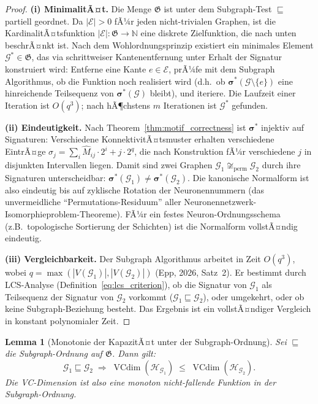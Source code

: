 ﻿\documentclass[12pt, a4paper, openany]{report}
\newtheorem{lemma}[theorem]{Lemma}
\newcommand{\N}{\mathbb{N}}
\newcommand{\calG}{\mathcal{G}}
\newcommand{\calH}{\mathcal{H}}
\newcommand{\calE}{\mathcal{E}}
\DeclareMathOperator{\VC}{VCdim}
\begin{document}
\begin{proof}
\textbf{(i) MinimalitÃ¤t.}
Die Menge $\mathfrak{G}$ ist unter dem Subgraph-Test $\sqsubseteq$ partiell
geordnet.  Da $|\calE| > 0$ fÃ¼r jeden nicht-trivialen Graphen, ist die
KardinalitÃ¤tsfunktion $|\calE| : \mathfrak{G} \to \N$ eine diskrete
Zielfunktion, die nach unten beschrÃ¤nkt ist.  Nach dem
Wohlordnungsprinzip existiert ein minimales Element $\calG^* \in \mathfrak{G}$,
das via schrittweiser Kantenentfernung unter Erhalt der Signatur konstruiert
wird: Entferne eine Kante $e \in \calE$, prÃ¼fe mit dem Subgraph Algorithmus,
ob die Funktion noch realisiert wird (d.h.\ ob $\bm{\sigma}^*(\calG \setminus \{e\})$
eine hinreichende Teilsequenz von $\bm{\sigma}^*(\calG)$ bleibt), und iteriere.
Die Laufzeit einer Iteration ist $O(q^3)$; nach hÃ¶chstens $m$ Iterationen
ist $\calG^*$ gefunden.

\textbf{(ii) Eindeutigkeit.}
Nach Theorem~\ref{thm:motif_correctness} ist $\bm{\sigma}^*$ injektiv auf
Signaturen: Verschiedene KonnektivitÃ¤tsmuster erhalten verschiedene EintrÃ¤ge
$\sigma_j = \sum_i \hat{M}_{ij} \cdot 2^i + j \cdot 2^q$, die nach
Konstruktion fÃ¼r verschiedene $j$ in disjunkten Intervallen liegen.  Damit
sind zwei Graphen $\calG_1 \not\cong_{\mathrm{perm}} \calG_2$ durch ihre
Signaturen unterscheidbar: $\bm{\sigma}^*(\calG_1) \neq \bm{\sigma}^*(\calG_2)$.
Die kanonische Normalform ist also eindeutig bis auf zyklische Rotation
der Neuronennummern (das unvermeidliche ``Permutations-Residuum'' aller
Neuronennetzwerk-Isomorphieproblem-Theoreme).  FÃ¼r ein festes Neuron-Ordnungsschema
(z.B.\ topologische Sortierung der Schichten) ist die Normalform vollstÃ¤ndig
eindeutig.

\textbf{(iii) Vergleichbarkeit.}
Der Subgraph Algorithmus arbeitet in Zeit $O(q^3)$, wobei $q = \max(|V(\calG_1)|,
|V(\calG_2)|)$ (Epp, 2026, Satz~2).  Er bestimmt durch LCS-Analyse
(Definition~\ref{eq:lcs_criterion}), ob die Signatur von $\calG_1$ als
Teilsequenz der Signatur von $\calG_2$ vorkommt ($\calG_1 \sqsubseteq \calG_2$),
oder umgekehrt, oder ob keine Subgraph-Beziehung besteht.  Das Ergebnis
ist ein vollstÃ¤ndiger Vergleich in konstant polynomialer Zeit.
\end{proof}

\begin{lemma}[Monotonie der KapazitÃ¤t unter der Subgraph-Ordnung]
\label{lem:capacity_monotone}
Sei $\sqsubseteq$ die Subgraph-Ordnung auf $\mathfrak{G}$.  Dann gilt:
\[
  \calG_1 \sqsubseteq \calG_2
  \;\Rightarrow\;
  \VC(\calH_{\calG_1}) \;\leq\; \VC(\calH_{\calG_2}).
\]
Die VC-Dimension ist also eine monoton nicht-fallende Funktion in der
Subgraph-Ordnung.
\end{lemma}
\end{document}

